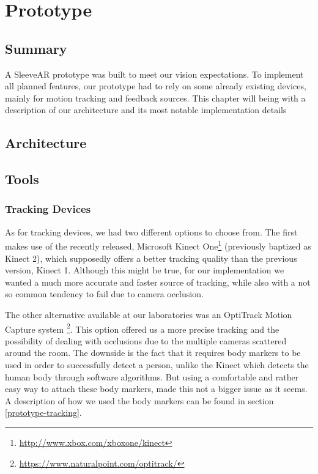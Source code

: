 \chapter{Prototype}
\label{sec:implementation}

\section*{Summary}
A SleeveAR prototype was built to meet our vision expectations. To implement all planned features, our prototype had to rely on some already existing devices, mainly for motion tracking and feedback sources. This chapter will being with a description of our architecture and its most notable implementation details



\section{Architecture}
\label{sec:impl:arch}



\section{Tools}
\label{sec:impl:tools}

\subsection{Tracking Devices}


As for tracking devices, we had two different options to choose from.
The first makes use of the recently released, Microsoft Kinect One\footnote{\url{http://www.xbox.com/xboxone/kinect}} 
(previously baptized as Kinect 2), which supposedly offers a better tracking quality than 
the previous version, Kinect 1. Although this might be true, for our implementation we wanted a much more accurate and faster source of tracking, while also with a not so common tendency to fail due to camera occlusion.

The other alternative available at our laboratories was an OptiTrack Motion Capture system \footnote{\url{https://www.naturalpoint.com/optitrack/}}. 
This option offered us a more precise tracking and the possibility of dealing with occlusions due to the multiple cameras scattered around the room. 
The downside is the fact that it requires body markers to be used in order to successfully detect a person, unlike the 
Kinect which detects the human body through software algorithms. 
But using a comfortable and rather easy way to attach these body markers, made this not a bigger issue as it seems. 
A description of how we used the body markers can be found in section \ref{prototype-tracking}.




